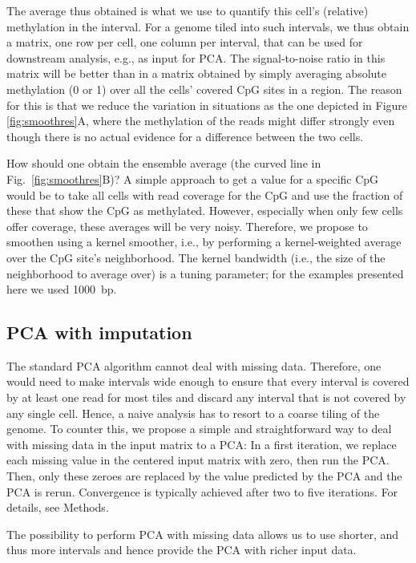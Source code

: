 \documentclass[twocolumn,10pt]{article}
\begin{document}
The average thus obtained is what we use to quantify this cell's (relative) methylation in the interval.
For a genome tiled into such intervals, we thus obtain a matrix, one row per cell, one column per interval, that can be used for downstream analysis, e.g., as input for PCA.
The signal-to-noise ratio in this matrix will be better than in a matrix obtained by simply averaging absolute methylation (0 or 1) over all the cells' covered CpG sites in a region.
The reason for this is that we reduce the variation in situations as the one depicted in Figure \ref{fig:smoothres}A, where the methylation of the reads might differ strongly even though there is no actual evidence for a difference between the two cells.

How should one obtain the ensemble average (the curved line in Fig.~\ref{fig:smoothres}B)? A simple approach to get a value for a specific CpG would be to take all cells with read coverage for the CpG and use the fraction of these that show the CpG as methylated.
However, especially when only few cells offer coverage, these averages will be very noisy.
Therefore, we propose to smoothen using a kernel smoother, i.e., by performing a kernel-weighted average over the CpG site's neighborhood.
The kernel bandwidth (i.e., the size of the neighborhood to average over) is a tuning parameter; for the examples presented here we used 1000~bp.


\subsection{PCA with imputation}

The standard PCA algorithm cannot deal with missing data.
Therefore, one would need to make intervals wide enough to ensure that every interval is covered by at least one read for most tiles and discard any interval that is not covered by any single cell.
Hence, a naive analysis has to resort to a coarse tiling of the genome.
To counter this, we propose a simple and straightforward way to deal with missing data in the input matrix to a PCA: In a first iteration, we replace each missing value in the centered input matrix with zero, then run the PCA.
Then, only these zeroes are replaced by the value predicted by the PCA and the PCA is rerun.
Convergence is typically achieved after two to five iterations.
For details, see Methods.


The possibility to perform PCA with missing data allows us to use shorter, and thus more intervals and hence provide the PCA with richer input data.
\end{document}
